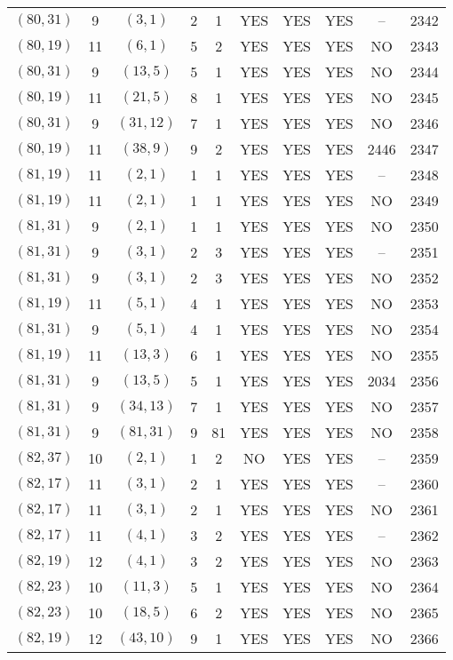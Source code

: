 \begin{longtable}{|c|c|c|c|c|c|c|c|c|c|}
$(80, 31)$ & 9 & $(3, 1)$ & 2 & 1 & YES & YES & YES & -- & 2342\\
$(80, 19)$ & 11 & $(6, 1)$ & 5 & 2 & YES & YES & YES & NO & 2343\\
$(80, 31)$ & 9 & $(13, 5)$ & 5 & 1 & YES & YES & YES & NO & 2344\\
$(80, 19)$ & 11 & $(21, 5)$ & 8 & 1 & YES & YES & YES & NO & 2345\\
$(80, 31)$ & 9 & $(31, 12)$ & 7 & 1 & YES & YES & YES & NO & 2346\\
$(80, 19)$ & 11 & $(38, 9)$ & 9 & 2 & YES & YES & YES & 2446 & 2347\\
$(81, 19)$ & 11 & $(2, 1)$ & 1 & 1 & YES & YES & YES & -- & 2348\\
$(81, 19)$ & 11 & $(2, 1)$ & 1 & 1 & YES & YES & YES & NO & 2349\\
$(81, 31)$ & 9 & $(2, 1)$ & 1 & 1 & YES & YES & YES & NO & 2350\\
$(81, 31)$ & 9 & $(3, 1)$ & 2 & 3 & YES & YES & YES & -- & 2351\\
$(81, 31)$ & 9 & $(3, 1)$ & 2 & 3 & YES & YES & YES & NO & 2352\\
$(81, 19)$ & 11 & $(5, 1)$ & 4 & 1 & YES & YES & YES & NO & 2353\\
$(81, 31)$ & 9 & $(5, 1)$ & 4 & 1 & YES & YES & YES & NO & 2354\\
$(81, 19)$ & 11 & $(13, 3)$ & 6 & 1 & YES & YES & YES & NO & 2355\\
$(81, 31)$ & 9 & $(13, 5)$ & 5 & 1 & YES & YES & YES & 2034 & 2356\\
$(81, 31)$ & 9 & $(34, 13)$ & 7 & 1 & YES & YES & YES & NO & 2357\\
$(81, 31)$ & 9 & $(81, 31)$ & 9 & 81 & YES & YES & YES & NO & 2358\\
$(82, 37)$ & 10 & $(2, 1)$ & 1 & 2 & NO & YES & YES & -- & 2359\\
$(82, 17)$ & 11 & $(3, 1)$ & 2 & 1 & YES & YES & YES & -- & 2360\\
$(82, 17)$ & 11 & $(3, 1)$ & 2 & 1 & YES & YES & YES & NO & 2361\\
$(82, 17)$ & 11 & $(4, 1)$ & 3 & 2 & YES & YES & YES & -- & 2362\\
$(82, 19)$ & 12 & $(4, 1)$ & 3 & 2 & YES & YES & YES & NO & 2363\\
$(82, 23)$ & 10 & $(11, 3)$ & 5 & 1 & YES & YES & YES & NO & 2364\\
$(82, 23)$ & 10 & $(18, 5)$ & 6 & 2 & YES & YES & YES & NO & 2365\\
$(82, 19)$ & 12 & $(43, 10)$ & 9 & 1 & YES & YES & YES & NO & 2366\\

\end{longtable}
